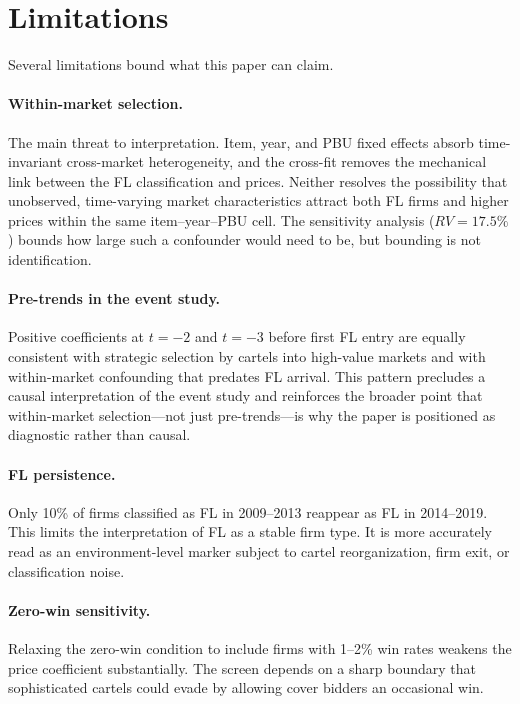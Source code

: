 
\section{Limitations}
\label{sec:limitations}

Several limitations bound what this paper can claim.

\paragraph{Within-market selection.}
The main threat to interpretation. Item, year, and PBU fixed effects
absorb time-invariant cross-market heterogeneity, and the cross-fit
removes the mechanical link between the FL classification and prices.
Neither resolves the possibility that unobserved, time-varying market
characteristics attract both FL firms and higher prices within the
same item--year--PBU cell. The sensitivity analysis ($RV = 17.5\%$)
bounds how large such a confounder would need to be, but bounding is
not identification.

\paragraph{Pre-trends in the event study.}
Positive coefficients at $t = -2$ and $t = -3$ before first FL entry
are equally consistent with strategic selection by cartels into
high-value markets and with within-market confounding that predates
FL arrival. This pattern precludes a causal interpretation of the event study
and reinforces the broader point that within-market selection---not
just pre-trends---is why the paper is positioned as diagnostic rather
than causal.

\paragraph{FL persistence.}
Only 10\% of firms classified as FL in 2009--2013 reappear as FL in
2014--2019. This limits the interpretation of FL as a stable firm
type. It is more accurately read as an environment-level marker
subject to cartel reorganization, firm exit, or classification noise.

\paragraph{Zero-win sensitivity.}
Relaxing the zero-win condition to include firms with 1--2\% win
rates weakens the price coefficient substantially. The screen depends
on a sharp boundary that sophisticated cartels could evade by allowing
cover bidders an occasional win.


